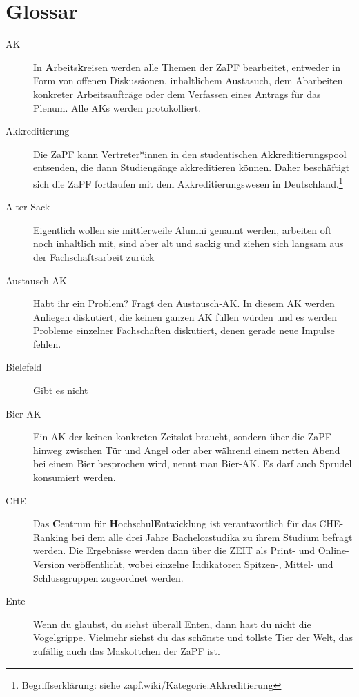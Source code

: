 
\newcommand*{\fett}[1]{\textbf{#1}}

\section{Glossar}

\begin{description}
	\item[AK] In \fett{A}rbeits\fett{k}reisen werden alle Themen der ZaPF bearbeitet, entweder in Form von offenen Diskussionen, inhaltlichem Austasuch, dem Abarbeiten konkreter Arbeitsaufträge oder dem Verfassen eines Antrags für das Plenum. Alle AKs werden protokolliert.
	\item[Akkreditierung] Die ZaPF kann Vertreter*innen in den studentischen Akkreditierungspool entsenden, die dann Studiengänge akkreditieren können. Daher beschäftigt sich die ZaPF fortlaufen mit dem Akkreditierungswesen in Deutschland.\footnote{Begriffserklärung: siehe zapf.wiki/Kategorie:Akkreditierung}
	\item[Alter Sack] Eigentlich wollen sie mittlerweile Alumni genannt werden, arbeiten oft noch inhaltlich mit, sind aber alt und sackig und ziehen sich langsam aus der Fachschaftsarbeit zurück
	\item[Austausch-AK] Habt ihr ein Problem? Fragt den Austausch-AK. In diesem AK werden Anliegen diskutiert, die keinen ganzen AK füllen würden und es werden Probleme einzelner Fachschaften diskutiert, denen gerade neue Impulse fehlen.
	\item[Bielefeld] Gibt es nicht
	\item[Bier-AK] Ein AK der keinen konkreten Zeitslot braucht, sondern über die ZaPF hinweg zwischen Tür und Angel oder aber während einem netten Abend bei einem Bier besprochen wird, nennt man Bier-AK. Es darf auch Sprudel konsumiert werden. 
	\item[CHE] Das \fett{C}entrum für \fett{H}ochschul\fett{E}ntwicklung ist verantwortlich für das CHE-Ranking bei dem alle drei Jahre Bachelorstudika zu ihrem Studium befragt werden. Die Ergebnisse werden dann über die ZEIT als Print- und Online-Version veröffentlicht, wobei einzelne Indikatoren Spitzen-, Mittel- und Schlussgruppen zugeordnet werden.
	\item[Ente] Wenn du glaubst, du siehst überall Enten, dann hast du nicht die Vogelgrippe. Vielmehr siehst du das schönste und tollste Tier der Welt, das zufällig auch das Maskottchen der ZaPF ist.

\end{description}
